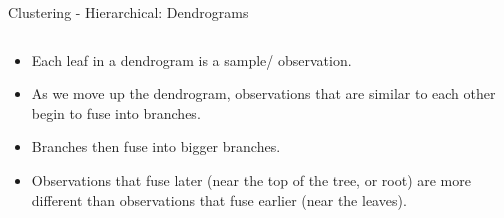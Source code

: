\begin{frame}[allowframebreaks]{Clustering - Hierarchical: Dendrograms}
\begin{columns}
    \begin{column}{0.45\textwidth}
        \begin{itemize}
            \setlength{\itemsep}{0.5em}
            \item Each leaf in a dendrogram is a sample/  observation.
            \item As we move up the dendrogram, observations  that are similar to each other begin to fuse  into branches.
            \item Branches then fuse into bigger branches.
            \item Observations that fuse later (near the top of  the tree, or root) are more different than observations that fuse earlier (near the leaves).
        \end{itemize}
    \end{column}

    \vspace{0.8em}


\end{columns}
\end{frame}
